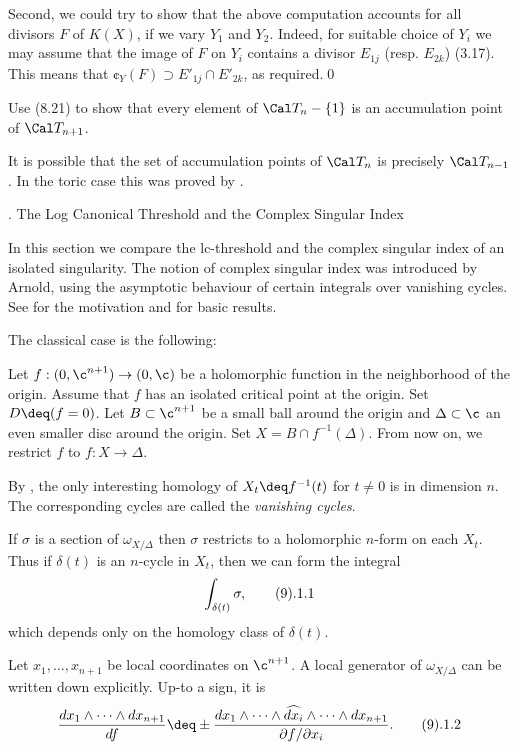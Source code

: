 Second, we could try to show that the above computation accounts for all
divisors
$F$ of $K(X)$, if we vary $Y_1$ and $Y_2$. Indeed, for suitable choice of
$Y_i$ we may assume that  the image of 
$F$ on $Y_i$ contains a divisor $E_{1j}$ (resp. $E_{2k}$)
(3.17). 
This means that  $\cent_Y(F)\supset E'_{1j}\cap E'_{2k}$, as
required.\qed\enddemo


 Use (8.21) to show that every element of $\Cal
T_n-\{1\}$ is an accumulation point of $\Cal T_{n+1}$. 

It is possible that the set of accumulation points  of $\Cal T_n$ is precisely
$\Cal T_{n-1}$.  In the toric case this was proved by \cite{Borisov95}. 
\enddemo



. The Log Canonical Threshold and the Complex Singular Index
\endhead

In this section we compare the lc-threshold  and 
the complex singular index of an isolated singularity. The notion of 
complex singular index was introduced by Arnold, using 
the asymptotic behaviour of
certain integrals over vanishing cycles. 
See  \cite{AGV85, II.Chap.13} for the motivation and for basic results.



The classical  case is the following:


  Let $f:(0,\c^{n+1})\to (0,\c)$  be a holomorphic
function in the neighborhood of the origin. Assume  that 
$f$ has an isolated critical point at the origin. Set $D\deq(f=0)$. 
Let $B\subset \c^{n+1}$ be a small ball around the origin and $\Delta\subset
\c$ an even smaller disc around the origin.  Set $X=B\cap f^{-1}(\Delta)$.
From now on, we restrict
$f$ to
$f:X\to\Delta$. 

By \cite{Milnor68}, the only interesting homology of $X_t\deq f^{-1}(t)$ 
for $t\neq 0$ is in dimension $n$. The corresponding cycles are called the {\it
vanishing cycles}.

If $\sigma $ is a section of $\omega_{X/\Delta}$ then $\sigma$ restricts to a
holomorphic $n$-form on each $X_t$. Thus if $\delta(t)$ is an $n$-cycle in
$X_t$, then we can form the integral
$$
\int_{\delta(t)} \sigma,\tag 9.1.1
$$
which depends only on the homology class of $\delta(t)$.

Let $x_1,\dots,x_{n+1}$ be local coordinates on $\c^{n+1}$. A local
generator of $\omega_{X/\Delta}$ can be written down explicitly. Up-to a
sign, it is
$$
\frac{dx_1\wedge\dots\wedge dx_{n+1}}{df}\deq\pm
\frac{dx_1\wedge\dots\wedge \widehat{dx_i}\wedge\dots\wedge dx_{n+1}}
{\partial f/\partial x_i}.\tag 9.1.2
$$
\enddemo

